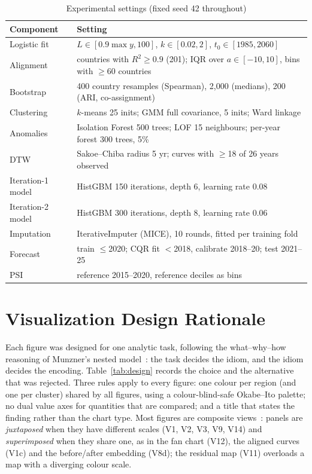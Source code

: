 \documentclass[conference,a4paper]{IEEEtran}
\begin{document}
\begin{table}[!t]
\centering
\caption{Experimental settings (fixed seed 42 throughout)}
\label{tab:setup}
\footnotesize
\begin{tabularx}{\columnwidth}{@{}l Y@{}}
\toprule
Component & Setting \\
\midrule
Logistic fit & $L\in[0.9\max y,100]$, $k\in[0.02,2]$, $t_0\in[1985,2060]$ \\
Alignment & countries with $R^2\ge0.9$ (201); IQR over $a\in[-10,10]$, bins with $\ge$60 countries \\
Bootstrap & 400 country resamples (Spearman), 2{,}000 (medians), 200 (ARI, co-assignment) \\
Clustering & $k$-means 25 inits; GMM full covariance, 5 inits; Ward linkage \\
Anomalies & Isolation Forest 500 trees; LOF 15 neighbours; per-year forest 300 trees, 5\% \\
DTW & Sakoe--Chiba radius 5 yr; curves with $\ge$18 of 26 years observed \\
Iteration-1 model & HistGBM 150 iterations, depth 6, learning rate 0.08 \\
Iteration-2 model & HistGBM 300 iterations, depth 8, learning rate 0.06 \\
Imputation & IterativeImputer (MICE), 10 rounds, fitted per training fold \\
Forecast & train $\le$2020; CQR fit $<$2018, calibrate 2018--20; test 2021--25 \\
PSI & reference 2015--2020, reference deciles as bins \\
\bottomrule
\end{tabularx}
\end{table}

\section{Visualization Design Rationale}\label{sec:design}
Each figure was designed for one analytic task, following the what--why--how reasoning of
Munzner's nested model~\cite{munzner2014}: the task decides the idiom, and the idiom decides the
encoding. Table~\ref{tab:design} records the choice and the alternative that was rejected. Three
rules apply to every figure: one colour per region (and one per cluster) shared by all figures, using a
colour-blind-safe Okabe--Ito palette; no dual value axes for quantities that are compared; and a title
that states the finding rather than the chart type. Most figures are composite
views~\cite{javed2012composite}: panels are \emph{juxtaposed} when they have different scales (V1, V2,
V3, V9, V14) and \emph{superimposed} when they share one, as in the fan chart (V12), the aligned curves
(V1c) and the before/after embedding (V8d); the residual map (V11) overloads a map with a diverging
colour scale.
\end{document}
